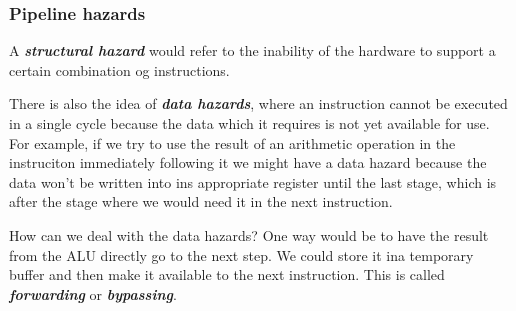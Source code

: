 \documentclass{article}
\begin{document}
\subsubsection{Pipeline hazards}
A \textit{\textbf{structural hazard}} would refer to the inability of the hardware to support a certain
combination og instructions.

There is also the idea of \textit{\textbf{data hazards}}, where an instruction cannot be executed in a 
single cycle because the data which it requires is not yet available for use. For example, if we try to 
use the result of an arithmetic operation in the instruciton immediately following it we might have a 
data hazard because the data won't be written into ins appropriate register until the last stage, which
is after the stage where we would need it in the next instruction.

How can we deal with the data hazards? One way would be to have the result from the ALU directly go to the next
step. We could store it ina temporary buffer and then make it available to the next instruction. This is called
\textit{\textbf{forwarding}} or \textit{\textbf{bypassing}}.
\end{document}

